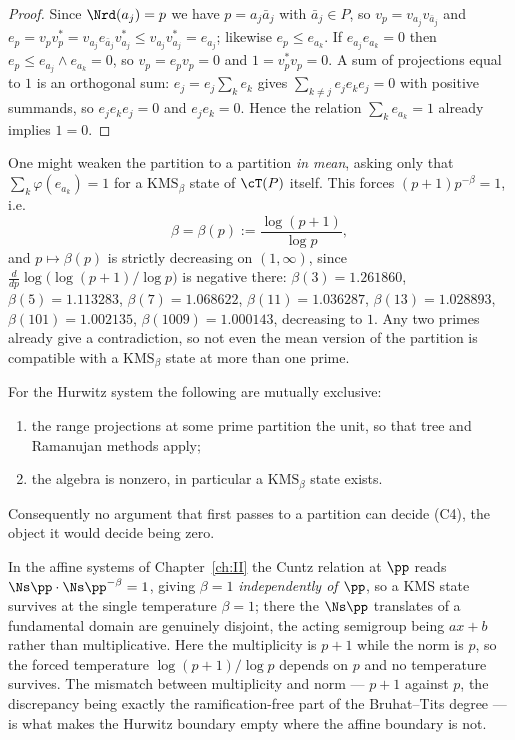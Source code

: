 \begin{proof}
Since $\Nrd(a_j)=p$ we have $p=a_j\bar a_j$ with $\bar a_j\in P$, so
$v_p=v_{a_j}v_{\bar a_j}$ and $e_p=v_pv_p^*=v_{a_j}e_{\bar a_j}v_{a_j}^*\le v_{a_j}v_{a_j}^*=e_{a_j}$;
likewise $e_p\le e_{a_k}$. If $e_{a_j}e_{a_k}=0$ then $e_p\le e_{a_j}\wedge e_{a_k}=0$, so
$v_p=e_pv_p=0$ and $1=v_p^*v_p=0$. A sum of projections equal to $1$ is an orthogonal sum:
$e_j=e_j\sum_ke_k$ gives $\sum_{k\ne j}e_je_ke_j=0$ with positive summands, so
$e_je_ke_j=0$ and $e_je_k=0$. Hence the relation $\sum_ke_{a_k}=1$ already implies $1=0$.
\end{proof}

\begin{remark}\label{XI:rem:betavals}
One might weaken the partition to a partition \emph{in mean}, asking only that
$\sum_k\varphi(e_{a_k})=1$ for a $\mathrm{KMS}_\beta$ state of $\cT(P)$ itself. This forces
$(p+1)p^{-\beta}=1$, i.e.
\[
\beta=\beta(p):=\frac{\log(p+1)}{\log p},
\]
and $p\mapsto\beta(p)$ is strictly decreasing on $(1,\infty)$, since
$\frac{d}{dp}\log\bigl(\log(p+1)/\log p\bigr)$ is negative there: $\beta(3)=1.261860$,
$\beta(5)=1.113283$, $\beta(7)=1.068622$, $\beta(11)=1.036287$, $\beta(13)=1.028893$,
$\beta(101)=1.002135$, $\beta(1009)=1.000143$, decreasing to $1$. Any two primes already
give a contradiction, so not even the mean version of the partition is compatible with a
$\mathrm{KMS}_\beta$ state at more than one prime.
\end{remark}

\begin{corollary}\label{XI:cor:dichotomy}
For the Hurwitz system the following are mutually exclusive:
\begin{enumerate}
\item the range projections at some prime partition the unit, so that tree and
Ramanujan methods apply;
\item the algebra is nonzero, in particular a $\mathrm{KMS}_\beta$ state exists.
\end{enumerate}
Consequently no argument that first passes to a partition can decide (C4), the object it
would decide being zero.
\end{corollary}

\begin{remark}\label{XI:rem:contrast}
In the affine systems of Chapter~\ref{ch:II} the Cuntz relation at $\pp$ reads
$\Ns\pp\cdot\Ns\pp^{-\beta}=1$, giving $\beta=1$ \emph{independently of $\pp$}, so a KMS state
survives at the single temperature $\beta=1$; there the $\Ns\pp$ translates of a fundamental
domain are genuinely disjoint, the acting semigroup being $ax+b$ rather than
multiplicative. Here the multiplicity is $p+1$ while the norm
is $p$, so the forced temperature $\log(p+1)/\log p$ depends on $p$ and no temperature
survives. The mismatch between multiplicity and norm --- $p+1$ against $p$, the discrepancy
being exactly the ramification-free part of the Bruhat--Tits degree --- is what makes the
Hurwitz boundary empty where the affine boundary is not.
\end{remark}

